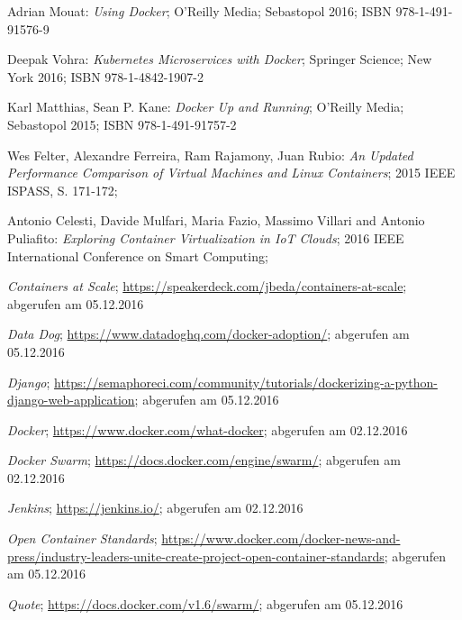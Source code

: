 \documentclass[12pt,toc=bib,toc=listof]{scrreprt}
\begin{document}
\appendix
\begin{thebibliography}{99}
\raggedright

 Adrian Mouat:
\emph{Using Docker};
O'Reilly Media; Sebastopol 2016;
ISBN 978-1-491-91576-9

 Deepak Vohra:
\emph{Kubernetes Microservices with Docker};
Springer Science; New York 2016;
ISBN 978-1-4842-1907-2

 Karl Matthias, Sean P. Kane:
\emph{Docker Up and Running};
O'Reilly Media; Sebastopol 2015;
ISBN 978-1-491-91757-2

 Wes Felter, Alexandre Ferreira, Ram Rajamony, Juan Rubio:
\emph{An Updated Performance Comparison of Virtual Machines and Linux Containers};
2015 IEEE ISPASS, S. 171-172;

 Antonio Celesti, Davide Mulfari, Maria Fazio, Massimo Villari and Antonio Puliafito:
\emph{Exploring Container Virtualization in IoT Clouds};
2016 IEEE International Conference on Smart Computing;



 
  \emph{Containers at Scale};
 \url{https://speakerdeck.com/jbeda/containers-at-scale};
 abgerufen am 05.12.2016
 
   \emph{Data Dog};
  \url{ https://www.datadoghq.com/docker-adoption/};
  abgerufen am 05.12.2016
  
   \emph{Django};
  \url{https://semaphoreci.com/community/tutorials/dockerizing-a-python-django-web-application};
  abgerufen am 05.12.2016
  

 \emph{Docker};
 \url{https://www.docker.com/what-docker};
 abgerufen am 02.12.2016
 
  \emph{Docker Swarm};
 \url{https://docs.docker.com/engine/swarm/};
 abgerufen am 02.12.2016


  \emph{Jenkins};
 \url{https://jenkins.io/};
 abgerufen am 02.12.2016
  
  \emph{Open Container Standards};
 \url{https://www.docker.com/docker-news-and-press/industry-leaders-unite-create-project-open-container-standards};
 abgerufen am 05.12.2016
 
  \emph{Quote};
   \url{https://docs.docker.com/v1.6/swarm/};
   abgerufen am 05.12.2016



 
\end{thebibliography}
\end{document}
